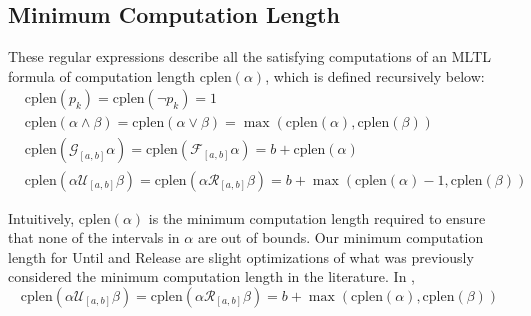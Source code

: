 \documentclass[runningheads]{llncs}
\begin{document}

 \subsection{Minimum Computation Length}
 These regular expressions describe all the satisfying computations of an MLTL formula of computation length $\text{cplen}(\alpha)$, which is defined recursively below:
\begin{align}
    &\text{cplen}(p_k) = \text{cplen}(\neg p_k) = 1\\
    &\text{cplen}(\alpha \land \beta) = \text{cplen}(\alpha \lor \beta) = \max(\text{cplen}(\alpha), \text{cplen}(\beta))\\
    &\text{cplen}(\mathcal{G}_{[a,b]} \alpha) = \text{cplen}(\mathcal{F}_{[a,b]} \alpha) = b + \text{cplen}(\alpha)\\
    &\text{cplen}(\alpha \mathcal{U}_{[a,b]} \beta) = \text{cplen}(\alpha \mathcal{R}_{[a,b]} \beta) = b + \max(\text{cplen}(\alpha)-1, \text{cplen}(\beta))
\end{align}
 
Intuitively, $\text{cplen}(\alpha)$ is the minimum computation length required to ensure that none of the intervals in $\alpha$ are out of bounds.
Our minimum computation length for Until and Release are slight optimizations of what was previously considered the minimum computation length in the literature. In \cite{KZJZR20}, $$\text{cplen}(\alpha \mathcal{U}_{[a,b]} \beta) = \text{cplen}(\alpha \mathcal{R}_{[a,b]} \beta) = b + \max(\text{cplen}(\alpha), \text{cplen}(\beta))$$
 
\end{document}
